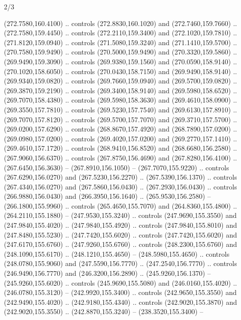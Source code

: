 \begin{flagdescription}{2/3}
\begin{scope}[xshift=0.5\flaglength,yshift=0.5\flagwidth,scale=\flagwidth/259.2]
\begin{scope}[y=0.8pt, x=0.8pt, yscale=-1,shift={(-243,-162)}]
      (272.7580,160.4100) .. controls (272.8830,160.1020) and (272.7460,159.7660) ..
      (272.7580,159.4450) .. controls (272.2110,159.3400) and (272.1020,159.7810) ..
      (271.8120,159.0940) .. controls (271.5080,159.3240) and (271.1410,159.5700) ..
      (270.7580,159.9490) .. controls (270.5000,159.9490) and (270.3320,159.5860) ..
      (269.9490,159.3090) .. controls (269.9380,159.1560) and (270.0590,158.9140) ..
      (270.1020,158.6050) .. controls (270.0430,158.7150) and (269.9490,158.9140) ..
      (269.9340,159.0820) .. controls (269.7660,159.0940) and (269.5700,159.0820) ..
      (269.3870,159.2190) .. controls (269.3400,158.9140) and (269.5980,158.6520) ..
      (269.7070,158.4380) .. controls (269.5980,158.3630) and (269.4610,158.0900) ..
      (269.3550,157.7810) .. controls (269.5230,157.7540) and (269.6130,157.8910) ..
      (269.7070,157.8120) .. controls (269.5700,157.7070) and (269.3710,157.5700) ..
      (269.0200,157.6290) .. controls (268.8670,157.4920) and (268.7890,157.0200) ..
      (269.0980,157.0200) .. controls (269.4020,157.0200) and (269.2770,157.1410) ..
      (269.4610,157.1720) .. controls (268.9410,156.8520) and (268.6680,156.2580) ..
      (267.9060,156.6370) .. controls (267.8750,156.4690) and (267.8280,156.4100) ..
      (267.6450,156.3630) -- (267.8910,156.1050) -- (267.7070,155.9220) .. controls
      (267.6290,156.0270) and (267.5230,156.2270) .. (267.5390,156.1370) .. controls
      (267.4340,156.0270) and (267.5860,156.0430) .. (267.2930,156.0430) .. controls
      (266.9880,156.0430) and (266.3950,156.1640) .. (265.9530,156.2580) --
      (266.1800,155.9960) .. controls (265.4650,155.7070) and (264.8360,155.4800) ..
      (264.2110,155.1880) -- (247.9530,155.3240) .. controls (247.9690,155.3550) and
      (247.9840,155.4020) .. (247.9840,155.4920) .. controls (247.9840,155.8010) and
      (247.8480,155.5230) .. (247.7420,155.6020) .. controls (247.7420,155.6020) and
      (247.6170,155.6760) .. (247.9260,155.6760) .. controls (248.2300,155.6760) and
      (248.1090,155.6170) .. (248.1210,155.4650) -- (248.5980,155.4650) .. controls
      (248.0780,155.9060) and (247.5590,156.7770) .. (247.2540,156.7770) .. controls
      (246.9490,156.7770) and (246.3200,156.2890) .. (245.9260,156.1370) --
      (245.9260,155.6020) .. controls (245.9690,155.5080) and (246.0160,155.4020) ..
      (246.0780,155.3120) -- (242.9920,155.3400) .. controls (242.9650,155.3550) and
      (242.9490,155.4020) .. (242.9180,155.4340) .. controls (242.9020,155.3870) and
      (242.9020,155.3550) .. (242.8870,155.3240) -- (238.3520,155.3400) --

\end{scope}
\end{scope}
\end{flagdescription}

